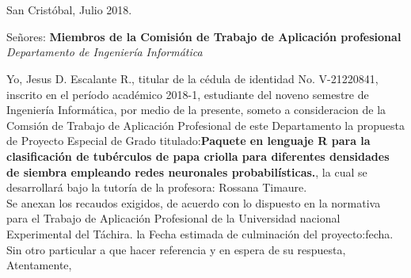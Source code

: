 \chapter*{}
\pagestyle{empty}
\thispagestyle{empty}
\begin{flushright}
San Crist\'obal, Julio 2018.
\end{flushright}


\begin{flushleft}
Se\~nores:
\textbf{Miembros de la Comisi\'on de Trabajo de Aplicaci\'on profesional}
\textit{Departamento de Ingenier\'ia Inform\'atica}
\end{flushleft}



	Yo, Jesus D. Escalante R., titular de la c\'edula de identidad No. V-21220841, inscrito en el per\'iodo acad\'emico 2018-1, estudiante del noveno semestre de Ingenier\'ia Inform\'atica, por medio de la presente, someto a consideracion de la Comsi\'on de Trabajo de Aplicaci\'on Profesional de este Departamento la propuesta de Proyecto Especial de Grado titulado:\textbf{Paquete en lenguaje R para la clasificaci\'on de tub\'erculos de papa criolla para diferentes densidades de siembra empleando redes neuronales probabil\'isticas.}, la cual se desarrollar\'a bajo la tutor\'ia de la profesora: Rossana Timaure.\\
	
	
	Se anexan los recaudos exigidos, de acuerdo con lo dispuesto en la normativa para el Trabajo de Aplicaci\'on Profesional de la Universidad nacional Experimental del T\'achira. la Fecha estimada de culminaci\'on del proyecto:fecha.\\
	
	
	Sin otro particular a que hacer referencia y en espera de su respuesta,\\
	
	
	Atentamente,\\
	
	
	\begin{center}
	
	
	
	\end{center}
	 